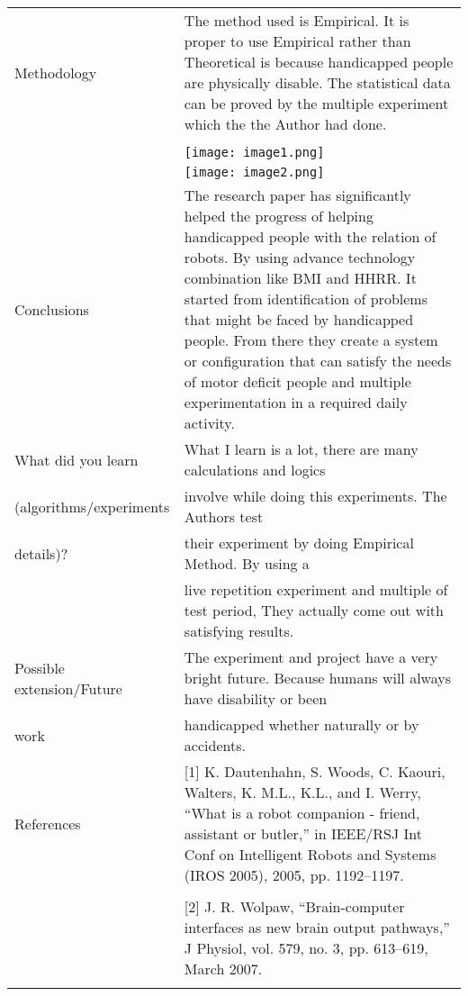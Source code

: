 \documentclass[a4paper, 12pt]{article}
\begin{document}
\setcounter{page}{3}

\begin{tabular}{| m{12em} | m{26em} |} 

\hline


Methodology & 
The method used is Empirical. It is proper to use Empirical rather than Theoretical is because handicapped people are physically disable. The statistical data can be proved by the multiple experiment which the the Author had done. \\
& \\
& \texttt{[image: image1.png]} \\
& \texttt{[image: image2.png]}\\

\hline

Conclusions & 
The research paper has significantly helped the progress of helping handicapped people with the relation of robots. By using advance technology combination like BMI and HHRR. It started from identification of problems that might be faced by handicapped people. From there they create a system or configuration that can satisfy the needs of motor deficit people and multiple experimentation in a required daily activity.   \\

\hline

What did you learn &
What I learn is a lot, there are many calculations and logics \\
(algorithms/experiments & involve while doing this experiments. The Authors test \\
details)? & their experiment by doing Empirical Method. By using a  \\
& live repetition experiment and multiple of test period, They actually come out with satisfying results. \\
Possible extension/Future & The experiment and project have a very bright future. Because humans will always have disability or been  \\
work & handicapped whether naturally or by accidents. \\

\hline

References & [1] K. Dautenhahn, S. Woods, C. Kaouri, Walters, K. M.L., K.L., and
I. Werry, “What is a robot companion - friend, assistant or butler,” in
IEEE/RSJ Int Conf on Intelligent Robots and Systems (IROS 2005),
2005, pp. 1192–1197. \\
&\\ 
& [2] J. R. Wolpaw, “Brain-computer interfaces as new brain output pathways,”
J Physiol, vol. 579, no. 3, pp. 613–619, March 2007. \\
&\\


\hline

\end{tabular}
\end{document}
